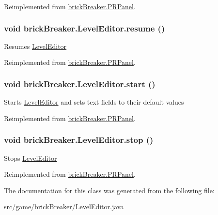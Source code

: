Reimplemented from \hyperlink{classbrick_breaker_1_1_p_r_panel_a0868e501fc5599973492e6f0c53da920}{brickBreaker.PRPanel}.

\hypertarget{classbrick_breaker_1_1_level_editor_a25e9ea0a6e91f1848c3b76f66a238789}{
\subsubsection[{resume}]{\setlength{\rightskip}{0pt plus 5cm}void brickBreaker.LevelEditor.resume ()}}
\label{classbrick_breaker_1_1_level_editor_a25e9ea0a6e91f1848c3b76f66a238789}
Resumes \hyperlink{classbrick_breaker_1_1_level_editor}{LevelEditor} 

Reimplemented from \hyperlink{classbrick_breaker_1_1_p_r_panel_ac9aadc88543f9032a27f3eb2b8ea908b}{brickBreaker.PRPanel}.

\hypertarget{classbrick_breaker_1_1_level_editor_ab2df7eb7b75f4e87b25c4b2d9422dc3d}{
\subsubsection[{start}]{\setlength{\rightskip}{0pt plus 5cm}void brickBreaker.LevelEditor.start ()}}
\label{classbrick_breaker_1_1_level_editor_ab2df7eb7b75f4e87b25c4b2d9422dc3d}
Starts \hyperlink{classbrick_breaker_1_1_level_editor}{LevelEditor} and sets text fields to their default values 

Reimplemented from \hyperlink{classbrick_breaker_1_1_p_r_panel_a94e190e70d6aa937068cbf5e8cff523e}{brickBreaker.PRPanel}.

\hypertarget{classbrick_breaker_1_1_level_editor_aa38941ac69b2b38f472fd402d3e33e40}{
\subsubsection[{stop}]{\setlength{\rightskip}{0pt plus 5cm}void brickBreaker.LevelEditor.stop ()}}
\label{classbrick_breaker_1_1_level_editor_aa38941ac69b2b38f472fd402d3e33e40}
Stops \hyperlink{classbrick_breaker_1_1_level_editor}{LevelEditor} 

Reimplemented from \hyperlink{classbrick_breaker_1_1_p_r_panel_ad077fab978f84663f366a6fdde5efe6c}{brickBreaker.PRPanel}.



The documentation for this class was generated from the following file:\begin{DoxyCompactItemize}
\item 
src/game/brickBreaker/LevelEditor.java\end{DoxyCompactItemize}
